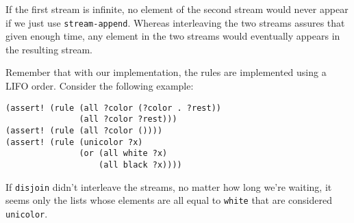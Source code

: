 \documentclass[a4paper,12pt]{article}
\begin{document}
If the first stream is infinite, no element of the second stream would
never appear if we just use \lstinline!stream-append!.  Whereas
interleaving the two streams assures that given enough time, any
element in the two streams would eventually appears in the resulting
stream.

Remember that with our implementation, the rules are implemented using
a LIFO order.  Consider the following example:

\begin{lstlisting}
(assert! (rule (all ?color (?color . ?rest))
               (all ?color ?rest)))
(assert! (rule (all ?color ())))
(assert! (rule (unicolor ?x)
               (or (all white ?x)
                   (all black ?x))))
\end{lstlisting}

If \lstinline!disjoin! didn't interleave the streams, no matter how
long we're waiting, it seems only the lists whose elements are all
equal to \lstinline!white! that are considered \lstinline!unicolor!.
\end{document}
